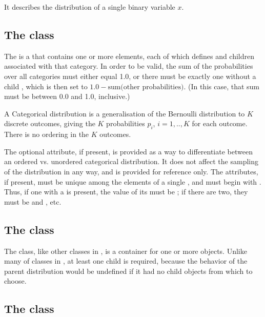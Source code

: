 It describes the distribution of a single binary variable $ x $.

\subsection{The  class}
\label{CategoricalDistribution-class}
\label{categoricaldistribution-class}

The \CategoricalDistribution is a \CategoricalUnivariateDistribution that contains one or more \Category elements, each of which defines \UncertValue {} and  children associated with that category.  In order to be valid, the sum of the probabilities over all categories must either equal 1.0, or there must be exactly one \Category without a child \UncertValue {}, which is then set to $ 1.0 - \text{sum(other probabilities)}$.  (In this case, that sum must be between 0.0 and 1.0, inclusive.)

A Categorical distribution is a generalisation of the Bernoulli distribution to $ K $ discrete outcomes, giving the $ K $ probabilities $ p_i $, $ i=1,..,K $ for each outcome. There is no ordering in the $ K $ outcomes.

The optional  attribute, if present, is provided as a way to differentiate between an ordered vs. unordered categorical distribution.  It does not affect the sampling of the distribution in any way, and is provided for reference only.  The  attributes, if present, must be unique among the \Category elements of a single \CategoricalDistribution, and must begin with .  Thus, if one \Category with a  is present, the value of its  must be ; if there are two, they must be  and , etc.


\subsection{The  class}
\label{ListOfCategories-class}
\label{listofcategories-class}

The \ListOfCategories class, like other \ListOf classes in \sbmlthreecore, is a container for one or more \Category objects.  Unlike many of \ListOf classes in \sbmlthreecore, at least one child \Category is required, because the behavior of the parent distribution would be undefined if it had no child \Category objects from which to choose.


\subsection{The  class}
\label{Category-class}
\label{category-class}

